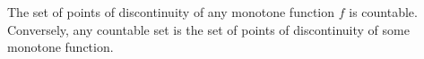 The set of points of discontinuity of any monotone function $f$ is countable. Conversely, any countable set is the set of points of discontinuity of some monotone function.
